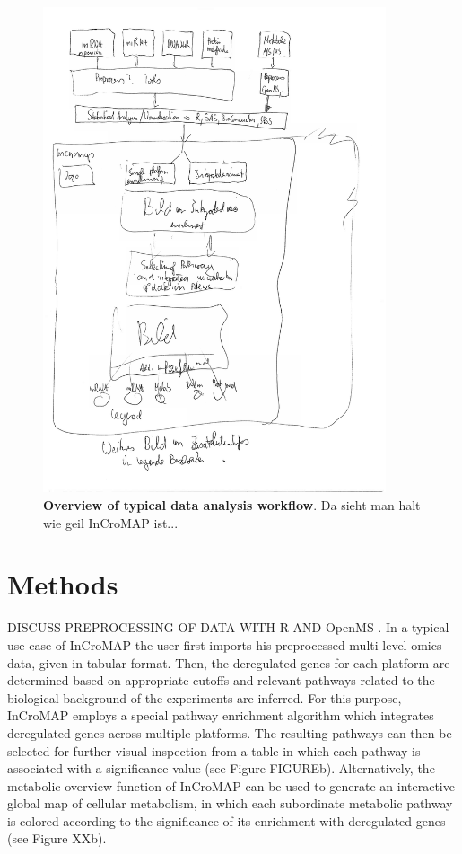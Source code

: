 \documentclass[final,5p,times,twocolumn]{elsarticle}
\begin{document}
\begin{figure}
\center
\includegraphics[width=0.9\textwidth]{incromap_overview.pdf}
\caption{\textbf{Overview of typical data analysis workflow}. Da sieht man halt wie geil InCroMAP ist...}
\label{fig:incromap-overview}
\end{figure}

\section{Methods}
DISCUSS PREPROCESSING OF DATA WITH R AND OpenMS \cite{Sturm2008}.
In a typical use case of InCroMAP the user first imports his preprocessed multi-level omics data, given in tabular format. Then, the deregulated genes for each platform are determined based on appropriate cutoffs and relevant pathways related to the biological background of the experiments are inferred. For this purpose, InCroMAP employs a special pathway enrichment algorithm which integrates deregulated genes across multiple platforms. The resulting pathways can then be selected for further visual inspection from a table in which each pathway is associated with a significance value (see Figure FIGUREb). Alternatively, the metabolic overview function of InCroMAP can be used to generate an interactive global map of cellular metabolism, in which each subordinate metabolic pathway is colored according to the significance of its enrichment with deregulated genes (see Figure XXb). 
\end{document}
